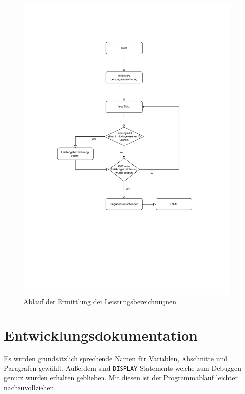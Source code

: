 \begin{figure}[!h]
    \centering
    \includegraphics[width=\textwidth,height=\textheight,keepaspectratio]{images/Erhalte_Leistungsbezeichnung-PAP.pdf}
    \caption{
        Ablauf der Ermittlung der Leistungsbezeichnugnen
    }
    \label{fig:diagramm3}
\end{figure}



\section{Entwicklungsdokumentation}\label{sec:entwicklerdokumentation}
Es wurden grundsätzlich sprechende Namen für Variablen, Abschnitte und Paragrafen gewählt. Außerdem sind \texttt{DISPLAY} Statements welche zum Debuggen genutz wurden erhalten geblieben. Mit diesen ist der Programmablauf leichter nachzuvollziehen.

